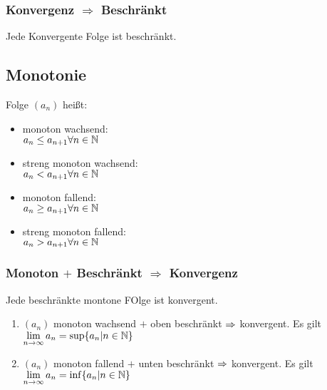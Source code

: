 \subsubsection*{Konvergenz \texorpdfstring{$\Rightarrow$}{folglich} Beschränkt}
Jede Konvergente Folge ist beschränkt.
\subsection*{Monotonie}
Folge $(a_n)$ heißt:
\begin{itemize}[noitemsep]
    \item monoton wachsend: \\
    $a_n \leq a_{n+1} \forall n \in \mathbb N$
    \item streng monoton wachsend:\\
    $a_n < a_{n+1} \forall n \in \mathbb N$
    \item monoton fallend:\\
    $a_n \geq a_{n+1} \forall n \in \mathbb N$
    \item streng monoton fallend:\\
    $a_n > a_{n+1} \forall n \in \mathbb N$
\end{itemize}
\subsubsection*{Monoton \texorpdfstring{$+$}{plus} Beschränkt \texorpdfstring{$\Rightarrow$}{folglich} Konvergenz}
Jede beschränkte montone FOlge ist konvergent.
\begin{enumerate}[label=\alph*., noitemsep]
    \item $(a_n)$ monoton wachsend $+$ oben beschränkt $\Rightarrow$ konvergent. Es gilt $\lim\limits_{n\rightarrow \infty} a_n= \sup \{a_n|n \in \mathbb N\}$
    \item $(a_n)$ monoton fallend $+$ unten beschränkt $\Rightarrow$ konvergent. Es gilt $\lim\limits_{n\rightarrow \infty} a_n= \inf \{a_n|n \in \mathbb N\}$
\end{enumerate}
